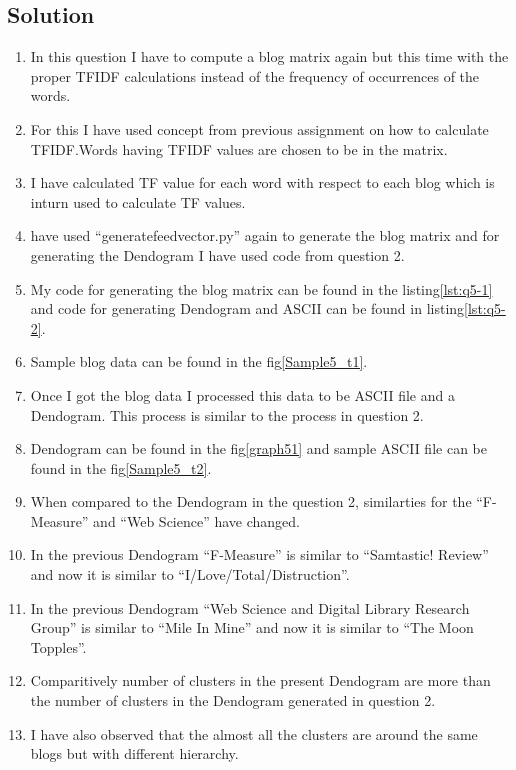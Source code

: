 \subsection{Solution}
\begin{enumerate}
\item In this question I have to compute a blog matrix again but this time with the proper TFIDF calculations instead of the frequency of occurrences of the words.
\item For this I have used concept from previous assignment on how to calculate TFIDF.Words having TFIDF values are chosen to be in the matrix.
\item I have calculated TF value for each word with respect to each blog which is inturn used to calculate TF values.
\item  have used ``generatefeedvector.py'' again to generate the blog matrix and for generating the Dendogram I have used code from question 2.
\item My code for generating the blog matrix can be found in the listing\ref{lst:q5-1} and code for generating Dendogram and ASCII can be found in listing\ref{lst:q5-2}.
\item Sample blog data can be found in the fig\ref{Sample5_t1}.
\item Once I got the blog data I processed this data to be ASCII file and a Dendogram. This process is similar to the process in question 2.
\item Dendogram can be found in the fig\ref{graph51} and sample ASCII file can be found in the fig\ref{Sample5_t2}.
\item When compared to the Dendogram in the question 2, similarties for the ``F-Measure'' and ``Web Science'' have changed. 
\item In the previous Dendogram ``F-Measure'' is similar to ``Samtastic! Review'' and now it is similar to ``I/Love/Total/Distruction''.
\item In the previous Dendogram ``Web Science and Digital Library Research Group'' is similar to ``Mile In Mine'' and now it is similar to ``The Moon Topples''.
\item Comparitively number of clusters in the present Dendogram are more than the number of clusters in the Dendogram generated in question 2.
\item I have also observed that the almost all the clusters are around the same blogs but with different hierarchy.
\end{enumerate}
\newpage

